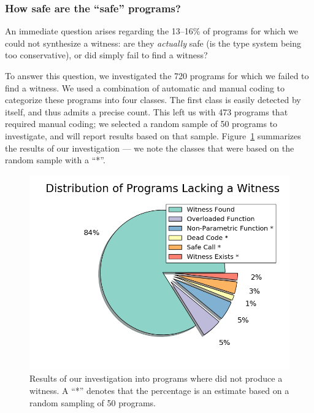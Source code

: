 \subsubsection{How safe are the ``safe'' programs?}
\label{sec:how-safe}

An immediate question arises regarding the 13--16\% of programs for
which we could not synthesize a witness:
%
are they \emph{actually} safe (\ie is the type system being too conservative),
%
or did \toolname simply fail to find a witness?
%

To answer this question, we investigated the 720 \ucsdbench programs for
which we failed to find a witness.
%
We used a combination of automatic and manual coding to categorize these
programs into four classes.
%
The first class is easily detected by \toolname itself, and thus admits
a precise count.
%
This left us with 473 programs that required manual coding; we selected
a random sample of 50 programs to investigate, and will report results
based on that sample.
%
Figure~\ref{fig:no-witness} summarizes the results of our investigation ---
we note the classes that were based on the random sample with a ``*''.


\begin{figure}[t]
\includegraphics[width=0.8\linewidth]{distrib_ext.png}
\vspace{-0.75cm}
\caption{Results of our investigation into programs where \toolname
  did not produce a witness. A ``*'' denotes that the percentage is an
  estimate based on a random sampling of 50 programs.}
\label{fig:no-witness}
\end{figure}

